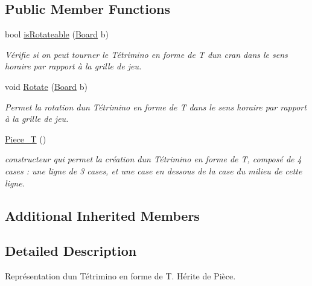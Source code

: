 \subsection*{Public Member Functions}
\begin{DoxyCompactItemize}
\item 
bool \hyperlink{classPiece__T_a64088f0140b870d178169e36460cd4de}{is\+Rotateable} (\hyperlink{classBoard}{Board} b)
\begin{DoxyCompactList}\small\item\em Vérifie si on peut tourner le Tétrimino en forme de T d\textquotesingle{}un cran dans le sens horaire par rapport à la grille de jeu. \end{DoxyCompactList}\item 
void \hyperlink{classPiece__T_affedcbe550aebd2a9e8ec169d1fe0a9f}{Rotate} (\hyperlink{classBoard}{Board} b)
\begin{DoxyCompactList}\small\item\em Permet la rotation d\textquotesingle{}un Tétrimino en forme de T dans le sens horaire par rapport à la grille de jeu. \end{DoxyCompactList}\item 
\mbox{\label{classPiece__T_aa83bf987b663f99cc412f59ec08a94a1}} 
\hyperlink{classPiece__T_aa83bf987b663f99cc412f59ec08a94a1}{Piece\+\_\+T} ()
\begin{DoxyCompactList}\small\item\em constructeur qui permet la création d\textquotesingle{}un Tétrimino en forme de T, composé de 4 cases \+: une ligne de 3 cases, et une case en dessous de la case du milieu de cette ligne. \end{DoxyCompactList}\end{DoxyCompactItemize}
\subsection*{Additional Inherited Members}


\subsection{Detailed Description}
Représentation d\textquotesingle{}un Tétrimino en forme de T. Hérite de Pièce. 

